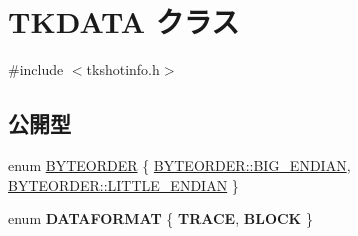 \hypertarget{class_t_k_d_a_t_a}{}\section{T\+K\+D\+A\+TA クラス}
\label{class_t_k_d_a_t_a}


{\ttfamily \#include $<$tkshotinfo.\+h$>$}

\subsection*{公開型}
\begin{DoxyCompactItemize}
\item 
enum \hyperlink{class_t_k_d_a_t_a_ab55f2c2d1c76bbeb3c1820ad2e749f38}{B\+Y\+T\+E\+O\+R\+D\+ER} \{ \hyperlink{class_t_k_d_a_t_a_ab55f2c2d1c76bbeb3c1820ad2e749f38a3e3837ede152d846a1d1c6e4b5de4432}{B\+Y\+T\+E\+O\+R\+D\+E\+R\+::\+B\+I\+G\+\_\+\+E\+N\+D\+I\+AN}, 
\hyperlink{class_t_k_d_a_t_a_ab55f2c2d1c76bbeb3c1820ad2e749f38ad2a887ba52940d91adca3b45876dcf7c}{B\+Y\+T\+E\+O\+R\+D\+E\+R\+::\+L\+I\+T\+T\+L\+E\+\_\+\+E\+N\+D\+I\+AN}
 \}
\item 
\mbox{\label{class_t_k_d_a_t_a_add3f58dbf65c97f4c9998e3a8b3f79fd}} 
enum {\bfseries D\+A\+T\+A\+F\+O\+R\+M\+AT} \{ {\bfseries T\+R\+A\+CE}, 
{\bfseries B\+L\+O\+CK}
 \}
\end{DoxyCompactItemize}
